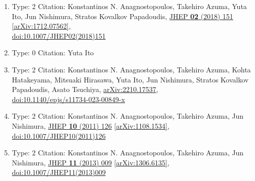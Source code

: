 \documentclass[a4paper,10pt]{article}
\begin{document}
\begin{enumerate}
\begin{enumerate}
  \item Type: 2 Citation: Konstantinos N. Anagnostopoulos, Takehiro Azuma, Yuta Ito, Jun Nishimura, Stratos Kovalkov Papadoudis, \href{https://www.doi.org/10.1007/JHEP02(2018)151}{JHEP {\bf 02} (2018) 151}  \href{https://arxiv.org/abs/1712.07562}{[arXiv:1712.07562]},\\\href{https://www.doi.org/10.1007/JHEP02(2018)151}{doi:10.1007/JHEP02(2018)151}
  \item Type: 0 Citation: Yuta Ito
  \item Type: 2 Citation: Konstantinos N. Anagnostopoulos, Takehiro Azuma, Kohta Hatakeyama, Mitsuaki Hirasawa, Yuta Ito, Jun Nishimura, Stratos Kovalkov Papadoudis, Asato Tsuchiya, \href{https://arxiv.org/abs/2210.17537}{arXiv:2210.17537},\\\href{https://www.doi.org/10.1140/epjs/s11734-023-00849-x}{doi:10.1140/epjs/s11734-023-00849-x}
  \item Type: 2 Citation: Konstantinos N. Anagnostopoulos, Takehiro Azuma, Jun Nishimura, \href{https://www.doi.org/10.1007/JHEP10(2011)126}{JHEP {\bf 10} (2011) 126}  \href{https://arxiv.org/abs/1108.1534}{[arXiv:1108.1534]},\\\href{https://www.doi.org/10.1007/JHEP10(2011)126}{doi:10.1007/JHEP10(2011)126}
  \item Type: 2 Citation: Konstantinos N. Anagnostopoulos, Takehiro Azuma, Jun Nishimura, \href{https://www.doi.org/10.1007/JHEP11(2013)009}{JHEP {\bf 11} (2013) 009}  \href{https://arxiv.org/abs/1306.6135}{[arXiv:1306.6135]},\\\href{https://www.doi.org/10.1007/JHEP11(2013)009}{doi:10.1007/JHEP11(2013)009}

\end{enumerate}
\end{enumerate}
\end{document}
